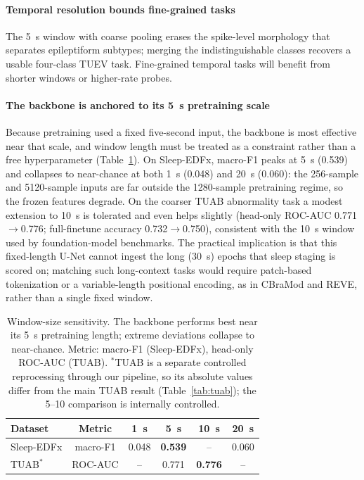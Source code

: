 \documentclass[journal]{IEEEtran}
\newcommand{\best}[1]{\textbf{#1}}
\begin{document}
\paragraph{Temporal resolution bounds fine-grained tasks} The \SI{5}{\second}
window with coarse pooling erases the spike-level morphology that separates
epileptiform subtypes; merging the indistinguishable classes recovers a usable
four-class TUEV task. Fine-grained temporal tasks will benefit from shorter
windows or higher-rate probes.

\paragraph{The backbone is anchored to its \SI{5}{\second} pretraining scale}
Because pretraining used a fixed five-second input, the backbone is most
effective near that scale, and window length must be treated as a constraint
rather than a free hyperparameter (Table~\ref{tab:window}). On Sleep-EDFx,
macro-F1 peaks at \SI{5}{\second} (\num{0.539}) and collapses to near-chance at
both \SI{1}{\second} (\num{0.048}) and \SI{20}{\second} (\num{0.060}): the
\num{256}-sample and \num{5120}-sample inputs are far outside the
\num{1280}-sample pretraining regime, so the frozen features degrade. On the
coarser TUAB abnormality task a modest extension to \SI{10}{\second} is tolerated
and even helps slightly (head-only ROC-AUC \num{0.771}$\to$\num{0.776};
full-finetune accuracy \num{0.732}$\to$\num{0.750}), consistent with the
\SI{10}{\second} window used by foundation-model benchmarks. The practical
implication is that this fixed-length U-Net cannot ingest the long
(\SI{30}{\second}) epochs that sleep staging is scored on; matching such
long-context tasks would require patch-based tokenization or a variable-length
positional encoding, as in CBraMod and REVE, rather than a single fixed window.

\begin{table}[t]
\centering
\caption{Window-size sensitivity. The backbone performs best near its
\SI{5}{\second} pretraining length; extreme deviations collapse to near-chance.
Metric: macro-F1 (Sleep-EDFx), head-only ROC-AUC (TUAB). $^{\ast}$TUAB is a
separate controlled reprocessing through our pipeline, so its absolute values
differ from the main TUAB result (Table~\ref{tab:tuab}); the \SI{5}{}--\SI{10}{}
comparison is internally controlled.}
\label{tab:window}
\small
\begin{tabular}{@{}lccccc@{}}
\toprule
Dataset & Metric & \SI{1}{\second} & \SI{5}{\second} & \SI{10}{\second} & \SI{20}{\second} \\
\midrule
Sleep-EDFx    & macro-F1 & 0.048 & \best{0.539} & --    & 0.060 \\
TUAB$^{\ast}$ & ROC-AUC  & --    & 0.771        & \best{0.776} & --    \\
\bottomrule
\end{tabular}
\end{table}
\end{document}
